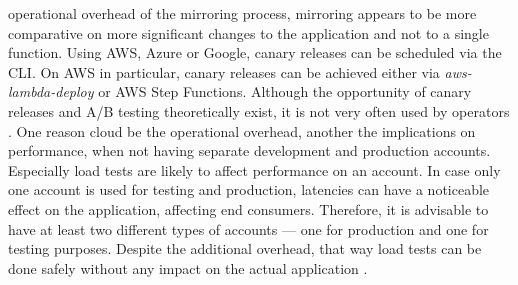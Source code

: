 \documentclass[11pt]{article}
\begin{document}
operational overhead of the mirroring process, mirroring appears to be more comparative on more significant changes to the application and not to a single function. Using AWS, Azure or Google, canary releases can be scheduled via the CLI. On AWS in particular, canary releases can be achieved either via \textit{aws-lambda-deploy} or AWS Step Functions. Although the opportunity of canary releases and A/B testing theoretically exist, it is not very often used by operators \cite{leitner2019mixed}. One reason cloud be the operational overhead, another the implications on performance, when not having separate development and production accounts. Especially load tests are likely to affect performance on an account. In case only one account is used for testing and production, latencies can have a noticeable effect on the application, affecting end consumers. Therefore, it is advisable to have at least two different types of accounts — one for production and one for testing purposes. Despite the additional overhead, that way load tests can be done safely without any impact on the actual application \cite{leitner2019mixed}.
\end{document}
